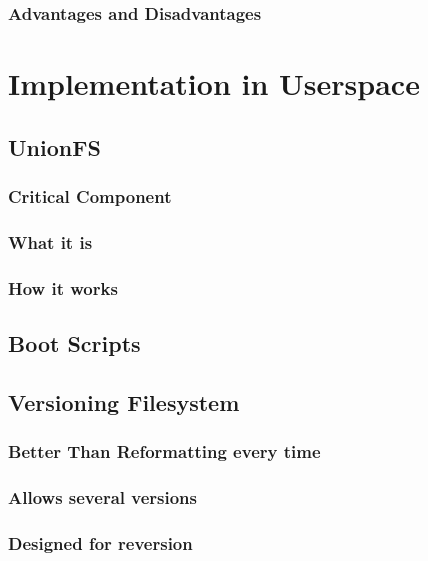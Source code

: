 \documentclass[11pt]{article}
\begin{document}
\subsubsection{Advantages and Disadvantages}

\section{Implementation in Userspace}
\subsection{UnionFS}
\subsubsection{Critical Component}
\subsubsection{What it is}
\subsubsection{How it works}
\subsection{Boot Scripts}
\subsection{Versioning Filesystem}
\subsubsection{Better Than Reformatting every time}
\subsubsection{Allows several versions}
\subsubsection{Designed for reversion}

\nocite{5350011,1520898,4595934}
\newpage



\end{document}

